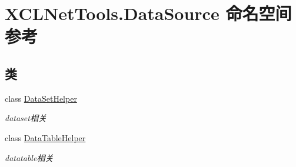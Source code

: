 \hypertarget{namespace_x_c_l_net_tools_1_1_data_source}{}\section{X\+C\+L\+Net\+Tools.\+Data\+Source 命名空间参考}
\label{namespace_x_c_l_net_tools_1_1_data_source}
\subsection*{类}
\begin{DoxyCompactItemize}
\item 
class \hyperlink{class_x_c_l_net_tools_1_1_data_source_1_1_data_set_helper}{Data\+Set\+Helper}
\begin{DoxyCompactList}\small\item\em dataset相关 \end{DoxyCompactList}\item 
class \hyperlink{class_x_c_l_net_tools_1_1_data_source_1_1_data_table_helper}{Data\+Table\+Helper}
\begin{DoxyCompactList}\small\item\em datatable相关 \end{DoxyCompactList}\end{DoxyCompactItemize}
